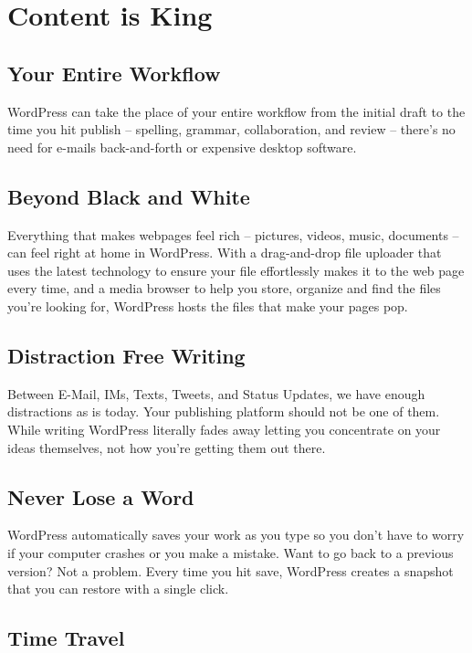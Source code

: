\section{Content is King}

\subsection{Your Entire Workflow}

WordPress can take the place of your entire workflow from the initial draft to the time you hit publish – spelling, grammar, collaboration, and review – there’s no need for e-mails back-and-forth or expensive desktop software.

\subsection{Beyond Black and White}

Everything that makes webpages feel rich – pictures, videos, music, documents – can feel right at home in WordPress. With a drag-and-drop file uploader that uses the latest technology to ensure your file effortlessly makes it to the web page every time, and a media browser to help you store, organize and find the files you’re looking for, WordPress hosts the files that make your pages pop.

\subsection{Distraction Free Writing}

Between E-Mail, IMs, Texts, Tweets, and Status Updates, we have enough distractions as is today. Your publishing platform should not be one of them. While writing WordPress literally fades away letting you concentrate on your ideas themselves, not how you’re getting them out there.

\subsection{Never Lose a Word}

WordPress automatically saves your work as you type so you don’t have to worry if your computer crashes or you make a mistake. Want to go back to a previous version? Not a problem. Every time you hit save, WordPress creates a snapshot that you can restore with a single click.

\subsection{Time Travel}

